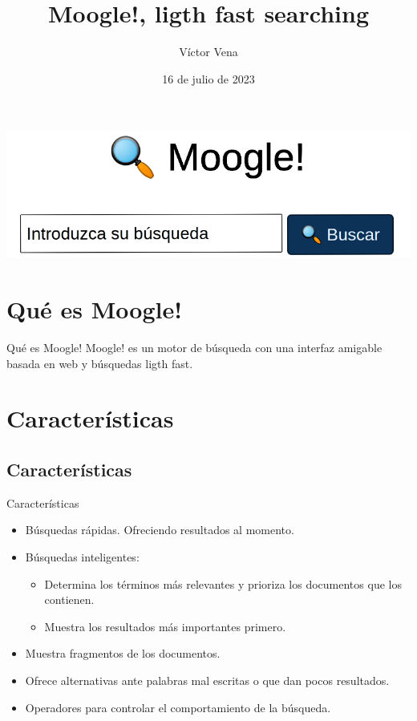 \documentclass{beamer}
\title{Moogle!, ligth fast searching}
\author{Víctor Vena}
\date{16 de julio de 2023}
\begin{document}
\begin{titlepage}

   \begin{center}
    \includegraphics[scale=0.25]{Imagenes/moogle.png}
   \end{center}

\end{titlepage}

\centering

\section{Qué es Moogle!}

\begin{frame}{Qué es Moogle!}
    Moogle! es un motor de búsqueda con una interfaz amigable basada en web y búsquedas ligth fast.    
\end{frame}


\section{Características}

\subsection{Características}

\begin{frame}{Características}

    \begin{itemize}
        \item<1-> Búsquedas rápidas. Ofreciendo resultados al momento.
        \item<2-> Búsquedas inteligentes:
        \begin{itemize}
            \item<3-> Determina los términos más relevantes y prioriza los documentos que los contienen.
            \item<4-> Muestra los resultados más importantes primero.
        \end{itemize}
        \item<5-> Muestra fragmentos de los documentos.
        \item<6-> Ofrece alternativas ante palabras mal escritas o que dan pocos resultados.
        \item<7-> Operadores para controlar el comportamiento de la búsqueda.
    \end{itemize}

\end{frame}
\end{document}
